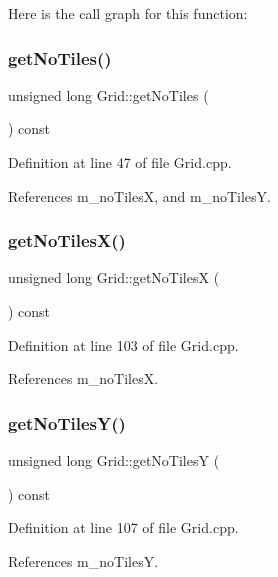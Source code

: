 Here is the call graph for this function\+:
\mbox{\label{class_grid_a25f914f4b6a8b4cb8af934a37b1e2a04}} 
\subsubsection{get\+No\+Tiles()}
{\footnotesize\ttfamily unsigned long Grid\+::get\+No\+Tiles (\begin{DoxyParamCaption}{ }\end{DoxyParamCaption}) const}



Definition at line 47 of file Grid.\+cpp.



References m\+\_\+no\+TilesX, and m\+\_\+no\+TilesY.

\mbox{\label{class_grid_af29c0c404a908aa46f83afb17d7609a6}} 
\subsubsection{get\+No\+Tiles\+X()}
{\footnotesize\ttfamily unsigned long Grid\+::get\+No\+TilesX (\begin{DoxyParamCaption}{ }\end{DoxyParamCaption}) const}



Definition at line 103 of file Grid.\+cpp.



References m\+\_\+no\+TilesX.

\mbox{\label{class_grid_a783a3153d03154cfd33e6a418bb8d390}} 
\subsubsection{get\+No\+Tiles\+Y()}
{\footnotesize\ttfamily unsigned long Grid\+::get\+No\+TilesY (\begin{DoxyParamCaption}{ }\end{DoxyParamCaption}) const}



Definition at line 107 of file Grid.\+cpp.



References m\+\_\+no\+TilesY.

